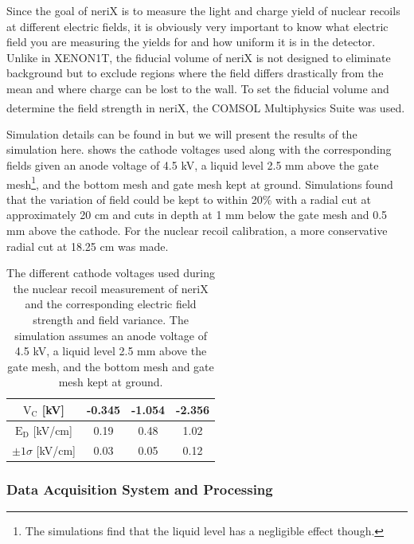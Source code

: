 Since the goal of neriX is to measure the light and charge yield of nuclear recoils at different electric fields, it is obviously very important to know what electric field you are measuring the yields for and how uniform it is in the detector.  Unlike in XENON1T, the fiducial volume of neriX is not designed to eliminate background but to exclude regions where the field differs drastically from the mean and where charge can be lost to the wall.  To set the fiducial volume and determine the field strength in neriX, the COMSOL Multiphysics\textsuperscript{\textregistered} Suite was used.  

Simulation details can be found in  but we will present the results of the simulation here.   shows the cathode voltages used along with the corresponding fields given an anode voltage of 4.5 kV, a liquid level 2.5 mm above the gate mesh\footnote{The simulations find that the liquid level has a negligible effect though.}, and the bottom mesh and gate mesh kept at ground.  Simulations found that the variation of field could be kept to within 20\% with a radial cut at approximately 20 cm and cuts in depth at 1 mm below the gate mesh and 0.5 mm above the cathode.  For the nuclear recoil calibration, a more conservative radial cut at 18.25 cm was made.  

\begin{table}[t]
\centering
\def\arraystretch{1.3}
\begin{tabular}{c|ccc}
$\textrm{V}_{\textrm{C}}$ [kV] & -0.345 & -1.054 & -2.356 \\
\hline
$\textrm{E}_{\textrm{D}}$ [kV/cm] & 0.19 & 0.48 & 1.02 \\ 
$\pm 1\sigma$ [kV/cm] & 0.03 & 0.05 & 0.12 \\ 
\end{tabular}
\caption{The different cathode voltages used during the nuclear recoil measurement of neriX and the corresponding electric field strength and field variance.  The simulation assumes an anode voltage of 4.5 kV, a liquid level 2.5 mm above the gate mesh, and the bottom mesh and gate mesh kept at ground.}
\label{tab:nerix_electric_fields}
\end{table}



\subsubsection{Data Acquisition System and Processing}

